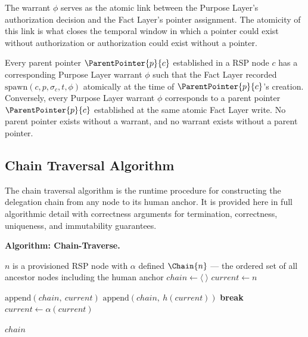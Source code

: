 The warrant $\phi$ serves as the atomic link between the Purpose Layer's authorization decision and the Fact Layer's pointer assignment. The atomicity of this link is what closes the temporal window in which a pointer could exist without authorization or authorization could exist without a pointer.

\begin{prop}
\label{prop:spawn-auth-completeness}
Every parent pointer $\ParentPointer{p}{c}$ established in a RSP node $c$ has a corresponding Purpose Layer warrant $\phi$ such that the Fact Layer recorded $\mathrm{spawn}(c, p, \sigma_c, t, \phi)$ atomically at the time of $\ParentPointer{p}{c}$'s creation. Conversely, every Purpose Layer warrant $\phi$ corresponds to a parent pointer $\ParentPointer{p}{c}$ established at the same atomic Fact Layer write. No parent pointer exists without a warrant, and no warrant exists without a parent pointer.
\end{prop}

\subsection{Chain Traversal Algorithm}
\label{sec:chain-traversal-algorithm}

The chain traversal algorithm is the runtime procedure for constructing the delegation chain from any node to its human anchor. It is provided here in full algorithmic detail with correctness arguments for termination, correctness, uniqueness, and immutability guarantees.

\medskip
\noindent\textbf{Algorithm: Chain-Traverse.}

\begin{algorithm}
\caption{Chain-Traverse($n$) --- Build the delegation chain from node $n$ to the human anchor}
\label{alg:chain-traverse}
\begin{algorithmic}[1]
\REQUIRE $n$ is a provisioned RSP node with $\alpha$ defined
\ENSURE $\Chain{n}$ --- the ordered set of all ancestor nodes including the human anchor
\STATE $chain \leftarrow \langle\ \rangle$ 
\STATE $current \leftarrow n$ 

    \STATE $\mathrm{append}(chain,\ current)$ 
        \STATE $\mathrm{append}(chain,\ h(current))$ 
        \STATE \textbf{break}
    \ENDIF
    \STATE $current \leftarrow \alpha(current)$ 
\ENDWHILE

\RETURN $chain$
\end{algorithmic}
\end{algorithm}

